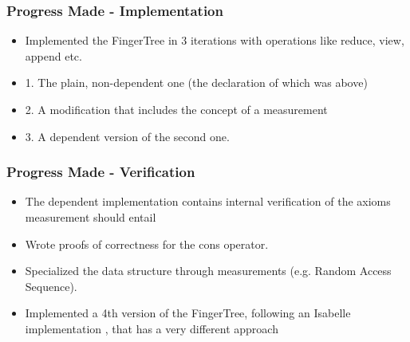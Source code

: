 \documentclass{beamer}
\begin{document}


\begin{frame} 
\frametitle{Progress Made - Implementation} 

\begin{itemize}
\item Implemented the FingerTree in 3 iterations with operations like reduce, view, append etc.
\item \hspace{5mm} 1. The plain, non-dependent one (the declaration of which was above)
\item \hspace{5mm} 2. A modification that includes the concept of a measurement \cite{rpat} 
\item \hspace{5mm} 3. A dependent version of the second one.
\end{itemize} 

\end{frame} 

\begin{frame}
\frametitle{Progress Made - Verification} 
\begin{itemize} 
\vspace{5mm}
\item The dependent implementation contains internal verification of the axioms measurement should entail
\vspace{5mm}
\item Wrote proofs of correctness for the cons operator.
\vspace{5mm} 
\item Specialized the data structure through measurements (e.g. Random Access Sequence). 
\vspace{5mm}
\item Implemented a 4th version of the FingerTree, following an Isabelle implementation \cite{isabelle}, that has a very different approach
\end{itemize}
\end{frame}
\end{document}
